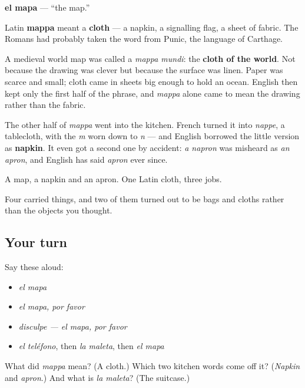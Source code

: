 \begin{cousinweb}
\textbf{el mapa} — \textquotedblleft{}the map.\textquotedblright{}

Latin \textbf{mappa} meant a \textbf{cloth} — a napkin, a signalling flag, a sheet of fabric. The Romans had probably taken the word from Punic, the language of Carthage.

A medieval world map was called a \emph{mappa mundi}: the \textbf{cloth of the world}. Not because the drawing was clever but because the surface was linen. Paper was scarce and small; cloth came in sheets big enough to hold an ocean. English then kept only the first half of the phrase, and \emph{mappa} alone came to mean the drawing rather than the fabric.

The other half of \emph{mappa} went into the kitchen. French turned it into \emph{nappe}, a tablecloth, with the \emph{m} worn down to \emph{n} — and English borrowed the little version as \textbf{napkin}. It even got a second one by accident: \emph{a napron} was misheard as \emph{an apron}, and English has said \emph{apron} ever since.

A map, a napkin and an apron. One Latin cloth, three jobs.
\end{cousinweb}

\begin{grammarlens}[title={What you've built}]
Four carried things, and two of them turned out to be bags and cloths rather than the objects you thought.
\end{grammarlens}

\subsection*{Your turn}
Say these aloud:

\begin{itemize}
\raggedright
  \item \emph{el mapa}
  \item \emph{el mapa, por favor}
  \item \emph{disculpe — el mapa, por favor}
  \item \emph{el teléfono}, then \emph{la maleta}, then \emph{el mapa}
\end{itemize}

\begin{tcolorbox}[breakable,colback=teal!4,colframe=teal!35!black,title={Before you move on}]
What did \emph{mappa} mean? (A cloth.) Which two kitchen words come off it? (\emph{Napkin} and \emph{apron}.) And what is \emph{la maleta}? (The suitcase.)
\end{tcolorbox}
